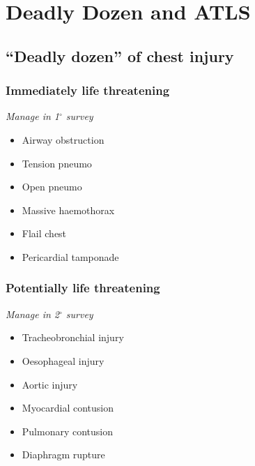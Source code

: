 \documentclass[
  12pt,
]{memoir}
\providecommand{\tightlist}{%
  \setlength{\itemsep}{0pt}\setlength{\parskip}{0pt}}
\begin{document}
\pagebreak

\hypertarget{deadly-dozen-and-atls}{%
\chapter{Deadly Dozen and ATLS}\label{deadly-dozen-and-atls}}

\hypertarget{deadly-dozen-of-chest-injury}{%
\section{``Deadly dozen'' of chest
injury}\label{deadly-dozen-of-chest-injury}}

\hypertarget{immediately-life-threatening}{%
\subsection{Immediately life
threatening}\label{immediately-life-threatening}}

\emph{Manage in 1\(^\circ\) survey}

\begin{itemize}
\tightlist
\item
  Airway obstruction
\item
  Tension pneumo
\item
  Open pneumo
\item
  Massive haemothorax
\item
  Flail chest
\item
  Pericardial tamponade
\end{itemize}

\hypertarget{potentially-life-threatening}{%
\subsection{Potentially life
threatening}\label{potentially-life-threatening}}

\emph{Manage in 2\(^\circ\) survey}

\begin{itemize}
\tightlist
\item
  Tracheobronchial injury
\item
  Oesophageal injury
\item
  Aortic injury
\item
  Myocardial contusion
\item
  Pulmonary contusion
\item
  Diaphragm rupture
\end{itemize}

\pagebreak
\end{document}
